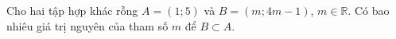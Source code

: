 \begin{ex}
Cho hai tập hợp khác rỗng $A=(1;5)$ và $B=(m;4m-1)$, $m\in\mathbb R$. Có bao nhiêu giá trị nguyên của tham số $m$ để $B\subset A$.
\end{ex}
